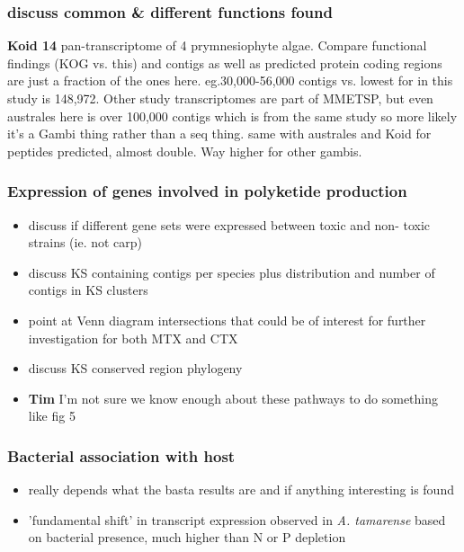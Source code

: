 \documentclass[12pt]{article}
\begin{document}
\subsubsection*{discuss common \& different functions found}
\textbf{Koid 14} pan-transcriptome of 4 prymnesiophyte algae. 
Compare functional findings (KOG vs. this) and contigs as well as predicted protein coding regions are just a fraction of the ones here. 
eg.30,000-56,000 contigs vs. lowest for in this study is 148,972. 
Other study transcriptomes are part of MMETSP, but even australes here is over 100,000 contigs which is from the same study so more likely it's a Gambi thing rather than a seq thing.
same with australes and Koid for peptides predicted, almost double. 
Way higher for other gambis.\\


\subsubsection*{Expression of genes involved in polyketide production}
\begin{itemize}
\item discuss if different gene sets were expressed between toxic and non- toxic strains (ie. not carp)
\item discuss KS containing contigs per species plus distribution and number of contigs in KS clusters
\item point at Venn diagram intersections that could be of interest for further investigation for both MTX and CTX
\item discuss KS conserved region phylogeny
\item \textbf{Tim} I'm not sure we know enough about these pathways to do something like fig 5 
\end{itemize}

\subsubsection*{Bacterial association with host}
\begin{itemize}
\item really depends what the basta results are and if anything interesting is found
\item 'fundamental shift' in transcript expression observed in \textit{A. tamarense} based on bacterial presence, much higher than N or P depletion \cite{moustafa2010transcriptome}
\end{itemize}
\end{document}
